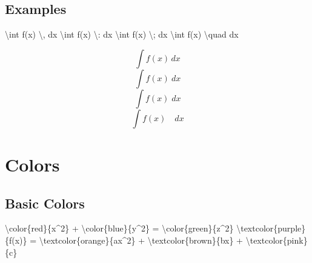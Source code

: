 \documentclass[
  letterpaper,
  DIV=11,
  numbers=noendperiod]{scrartcl}
\newenvironment{Shaded}{\begin{snugshade}}{\end{snugshade}}
\newcommand{\SpecialCharTok}[1]{\textcolor[rgb]{0.37,0.37,0.37}{#1}}
\newcommand{\SpecialStringTok}[1]{\textcolor[rgb]{0.13,0.47,0.30}{#1}}
\begin{document}
\hypertarget{examples-4}{%
\subsection{Examples}\label{examples-4}}

\begin{Shaded}
\begin{Highlighting}[]
\SpecialStringTok{$$}\SpecialCharTok{\textbackslash{}int}\SpecialStringTok{ f(x) }\SpecialCharTok{\textbackslash{},}\SpecialStringTok{ dx$$}
\SpecialStringTok{$$}\SpecialCharTok{\textbackslash{}int}\SpecialStringTok{ f(x) }\SpecialCharTok{\textbackslash{}:}\SpecialStringTok{ dx$$}
\SpecialStringTok{$$}\SpecialCharTok{\textbackslash{}int}\SpecialStringTok{ f(x) }\SpecialCharTok{\textbackslash{};}\SpecialStringTok{ dx$$}
\SpecialStringTok{$$}\SpecialCharTok{\textbackslash{}int}\SpecialStringTok{ f(x) }\SpecialCharTok{\textbackslash{}quad}\SpecialStringTok{ dx$$}
\end{Highlighting}
\end{Shaded}

\[\int f(x) \, dx\] \[\int f(x) \: dx\] \[\int f(x) \; dx\]
\[\int f(x) \quad dx\]

\hypertarget{colors}{%
\section{Colors}\label{colors}}

\hypertarget{basic-colors}{%
\subsection{Basic Colors}\label{basic-colors}}

\begin{Shaded}
\begin{Highlighting}[]
\SpecialStringTok{$$}\SpecialCharTok{\textbackslash{}color}\SpecialStringTok{\{red\}\{x\^{}2\} + }\SpecialCharTok{\textbackslash{}color}\SpecialStringTok{\{blue\}\{y\^{}2\} = }\SpecialCharTok{\textbackslash{}color}\SpecialStringTok{\{green\}\{z\^{}2\}$$}
\SpecialStringTok{$$}\SpecialCharTok{\textbackslash{}textcolor}\SpecialStringTok{\{purple\}\{f(x)\} = }\SpecialCharTok{\textbackslash{}textcolor}\SpecialStringTok{\{orange\}\{ax\^{}2\} + }\SpecialCharTok{\textbackslash{}textcolor}\SpecialStringTok{\{brown\}\{bx\} + }\SpecialCharTok{\textbackslash{}textcolor}\SpecialStringTok{\{pink\}\{c\}$$}
\end{Highlighting}
\end{Shaded}
\end{document}
